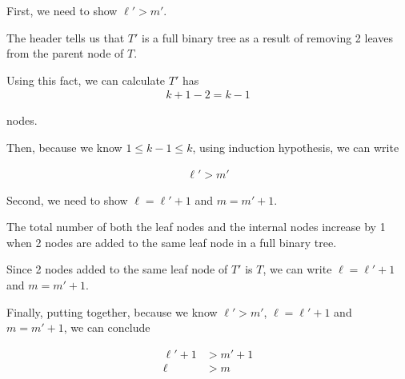 \documentclass[12pt]{article}
\begin{document}
\begin{itemize}
\begin{mdframed}
\begin{enumerate}[1.]
\begin{mdframed}
            \bigskip

            First, we need to show $\ell' > m'$.

            \bigskip

            The header tells us that $T'$ is a full binary tree as a result
            of removing 2 leaves from the parent node of $T$.

            \bigskip

            Using this fact, we can calculate $T'$ has
            \setcounter{equation}{0}
            \begin{align}
                k+1-2 = k-1
            \end{align}

            nodes.

            \bigskip

            Then, because we know $1 \leq k-1 \leq k$, using induction hypothesis,
            we can write

            \begin{align}
                \ell' > m'
            \end{align}

            \bigskip

            Second, we need to show $\ell = \ell' + 1$ and $m = m' + 1$.

            \bigskip

            The total number of both the leaf nodes and the internal
            nodes increase by 1 when 2 nodes are added to the same leaf node
            in a full binary tree.

            \bigskip

            Since 2 nodes added to the same leaf node of $T'$ is $T$, we can
            write $\ell = \ell' + 1$ and $m = m' + 1$.

            \bigskip

            Finally, putting together, because we know $\ell' > m'$, $\ell = \ell' + 1$
            and $m = m' + 1$, we can conclude

            \begin{align}
                \ell' + 1 &> m' + 1\\
                \ell &> m
            \end{align}

            \end{mdframed}

        \end{enumerate}


\end{mdframed}
\end{itemize}
\end{document}
